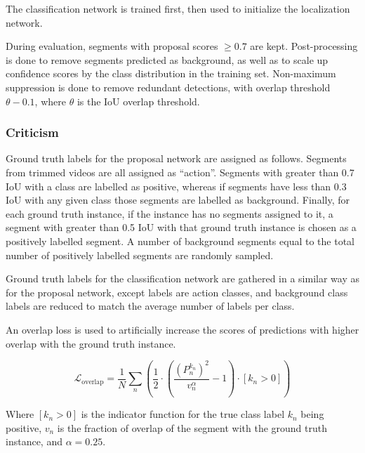 \documentclass[a4paper, 12pt]{article}
\begin{document}
The classification network is trained first, then used to initialize the
localization network.

During evaluation, segments with proposal scores $\geq 0.7$ are kept.
Post-processing is done to remove segments predicted as background, as well as
to scale up confidence scores by the class distribution in the training set.
Non-maximum suppression is done to remove redundant detections, with overlap
threshold $\theta - 0.1$, where $\theta$ is the IoU overlap threshold.

\subsubsection{Criticism}

Ground truth labels for the proposal network are assigned as follows. Segments
from trimmed videos are all assigned as ``action''. Segments with greater than
0.7 IoU with a class are labelled as positive, whereas if segments have less
than 0.3 IoU with any given class those segments are labelled as background.
Finally, for each ground truth instance, if the instance has no segments
assigned to it, a segment with greater than 0.5 IoU with that ground truth
instance is chosen as a positively labelled segment. A number of background
segments equal to the total number of positively labelled segments are randomly
sampled.

Ground truth labels for the classification network are gathered in a similar
way as for the proposal network, except labels are action classes, and
background class labels are reduced to match the average number of labels per
class.

An overlap loss is used to artificially increase the scores of predictions with
higher overlap with the ground truth instance.

\begin{equation}
        \mathcal{L}_{\textrm{overlap}} = \frac{1}{N} \sum_n
                \left(\frac{1}{2} \cdot
                        \left(
                                \frac{{\left( P_n^{k_n} \right)}^2}{v_n^\alpha}
                                - 1
                        \right)
                        \cdot \left[ k_n > 0 \right]
                \right)
\end{equation}

Where $\left[ k_n > 0 \right]$ is the indicator function for the true class
label $k_n$ being positive, $v_n$ is the fraction of overlap of the segment
with the ground truth instance, and $\alpha = 0.25$.
\end{document}
